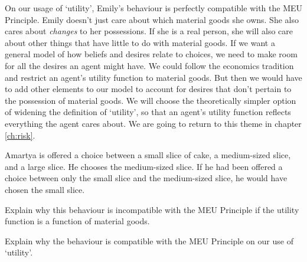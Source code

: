 On our usage of `utility', Emily's behaviour is perfectly compatible with the
MEU Principle. Emily doesn't just care about which material goods she
owns. She also cares about \emph{changes} to her possessions. If she is a real
person, she will also care about other things that have little to do with
material goods. If we want a general model of how beliefs and desires relate to
choices, we need to make room for all the desires an agent might have. We could
follow the economics tradition and restrict an agent's utility function to
material goods. But then we would have to add other elements to our model to
account for desires that don't pertain to the possession of material goods. We
will choose the theoretically simpler option of widening the definition of
`utility', so that an agent's utility function reflects everything the agent
cares about. We are going to return to this theme in chapter \ref{ch:risk}.


\begin{exercise}{2}
  Amartya is offered a choice between a small slice of cake, a medium-sized
  slice, and a large slice. He chooses the medium-sized slice. If he had been
  offered a choice between only the small slice and the medium-sized slice, he
  would have chosen the small slice.
  \begin{exlist}
    \item Explain why this behaviour is incompatible with the MEU Principle if
    the utility function is a function of material goods.
    \item Explain why the behaviour is compatible with the MEU Principle on our
    use of `utility'.
  \end{exlist}
\end{exercise}


